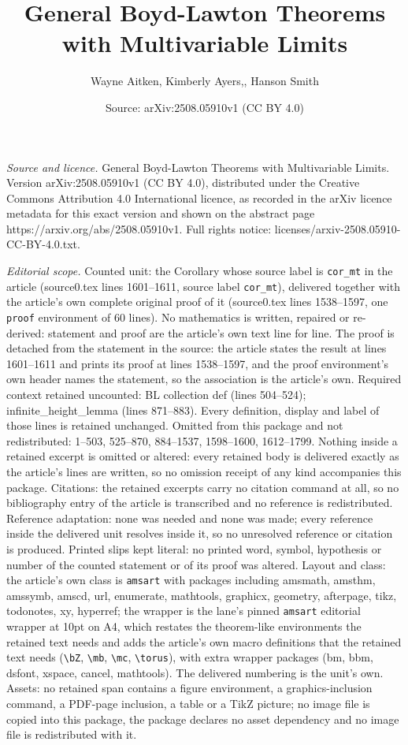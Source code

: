 \documentclass[10pt,a4paper]{amsart}
\title[General Boyd-Lawton Theorems with Multivariable Limits]{General Boyd-Lawton Theorems with Multivariable Limits}
\author{Wayne Aitken, Kimberly Ayers,, Hanson Smith}
\date{Source: arXiv:2508.05910v1 (CC BY 4.0)}
\begin{document}
\maketitle

\noindent\emph{Source and licence.} General Boyd-Lawton Theorems with Multivariable Limits. Version arXiv:2508.05910v1 (CC BY 4.0), distributed under the Creative Commons Attribution 4.0 International licence, as recorded in the arXiv licence metadata for this exact version and shown on the abstract page https://arxiv.org/abs/2508.05910v1. Full rights notice: licenses/arxiv-2508.05910-CC-BY-4.0.txt.\par\smallskip

\noindent\textit{Editorial scope.} Counted unit: the Corollary whose source label is \texttt{cor\_mt} in the article (source0.tex lines 1601--1611, source label \texttt{cor\_mt}), delivered together with the article's own complete original proof of it (source0.tex lines 1538--1597, one \texttt{proof} environment of 60 lines). No mathematics is written, repaired or re-derived: statement and proof are the article's own text line for line. The proof is detached from the statement in the source: the article states the result at lines 1601--1611 and prints its proof at lines 1538--1597, and the proof environment's own header names the statement, so the association is the article's own. Required context retained uncounted: BL collection def (lines 504--524); infinite\_height\_lemma (lines 871--883). Every definition, display and label of those lines is retained unchanged. Omitted from this package and not redistributed: 1--503, 525--870, 884--1537, 1598--1600, 1612--1799. Nothing inside a retained excerpt is omitted or altered: every retained body is delivered exactly as the article's lines are written, so no omission receipt of any kind accompanies this package. Citations: the retained excerpts carry no citation command at all, so no bibliography entry of the article is transcribed and no reference is redistributed. Reference adaptation: none was needed and none was made; every reference inside the delivered unit resolves inside it, so no unresolved reference or citation is produced. Printed slips kept literal: no printed word, symbol, hypothesis or number of the counted statement or of its proof was altered. Layout and class: the article's own class is \texttt{amsart} with packages including amsmath, amsthm, amssymb, amscd, url, enumerate, mathtools, graphicx, geometry, afterpage, tikz, todonotes, xy, hyperref; the wrapper is the lane's pinned \texttt{amsart} editorial wrapper at 10pt on A4, which restates the theorem-like environments the retained text needs and adds the article's own macro definitions that the retained text needs (\texttt{\textbackslash bZ}, \texttt{\textbackslash mb}, \texttt{\textbackslash mc}, \texttt{\textbackslash torus}), with extra wrapper packages (bm, bbm, dsfont, xspace, cancel, mathtools). The delivered numbering is the unit's own. Assets: no retained span contains a figure environment, a graphics-inclusion command, a PDF-page inclusion, a table or a TikZ picture; no image file is copied into this package, the package declares no asset dependency and no image file is redistributed with it. 
\end{document}
